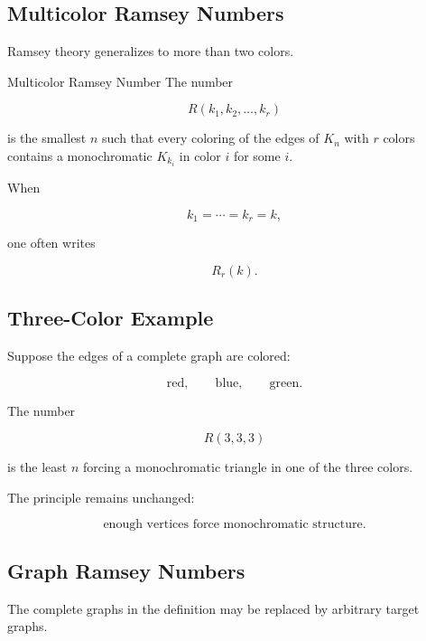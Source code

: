 \subsection{Multicolor Ramsey Numbers}
\label{subsec:multicolor-ramsey}

Ramsey theory generalizes to more than two colors.

\begin{definitionbox}{Multicolor Ramsey Number}
The number

\[
\boxed{
R(k_1,k_2,\ldots,k_r)
}
\]

is the smallest \(n\) such that every coloring of the edges of \(K_n\)
with \(r\) colors contains a monochromatic \(K_{k_i}\) in color \(i\)
for some \(i\).
\end{definitionbox}

When

\[
k_1=\cdots=k_r=k,
\]

one often writes

\[
\boxed{
R_r(k).
}
\]

\subsection{Three-Color Example}
\label{subsec:three-color-ramsey}

Suppose the edges of a complete graph are colored:

\[
\text{red},
\qquad
\text{blue},
\qquad
\text{green}.
\]

The number

\[
R(3,3,3)
\]

is the least \(n\) forcing a monochromatic triangle in one of the three
colors.

The principle remains unchanged:

\[
\boxed{
\text{enough vertices force monochromatic structure}.
}
\]

\subsection{Graph Ramsey Numbers}
\label{subsec:graph-ramsey-numbers}

The complete graphs in the definition may be replaced by arbitrary
target graphs.


